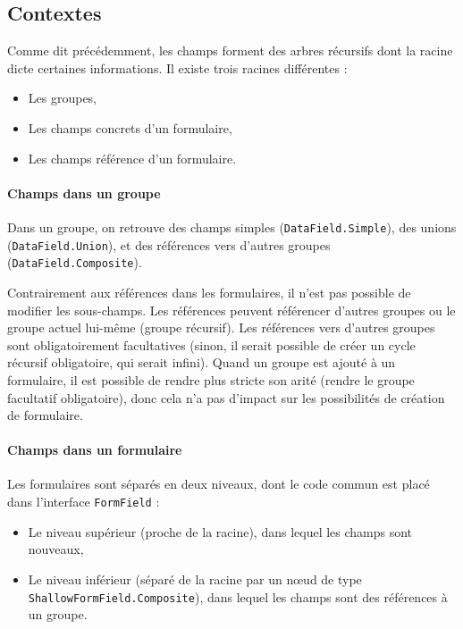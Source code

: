\subsection{Contextes}\label{subsec:contextes}
Comme dit précédemment, les champs forment des arbres récursifs dont la racine dicte certaines informations.
Il existe trois racines différentes :
\begin{itemize}
	\item Les groupes,
	\item Les champs concrets d'un formulaire,
	\item Les champs référence d'un formulaire.
\end{itemize}

\paragraph{Champs dans un groupe}
Dans un groupe, on retrouve des champs simples (\lstinline{DataField.Simple}), des unions (\lstinline{DataField.Union}), et des références vers d'autres groupes (\lstinline{DataField.Composite}).

Contrairement aux références dans les formulaires, il n'est pas possible de modifier les sous-champs.
Les références peuvent référencer d'autres groupes ou le groupe actuel lui-même (groupe récursif).
Les références vers d'autres groupes sont obligatoirement facultatives (sinon, il serait possible de créer un cycle récursif obligatoire, qui serait infini).
Quand un groupe est ajouté à un formulaire, il est possible de rendre plus stricte son arité (rendre le groupe facultatif obligatoire), donc cela n'a pas d'impact sur les possibilités de création de formulaire.

\paragraph{Champs dans un formulaire}
Les formulaires sont séparés en deux niveaux, dont le code commun est placé dans l'interface \lstinline{FormField} :
\begin{itemize}
	\item Le niveau supérieur (proche de la racine), dans lequel les champs sont nouveaux,
	\item Le niveau inférieur (séparé de la racine par un nœud de type \lstinline{ShallowFormField.Composite}), dans lequel les champs sont des références à un groupe.
\end{itemize}


